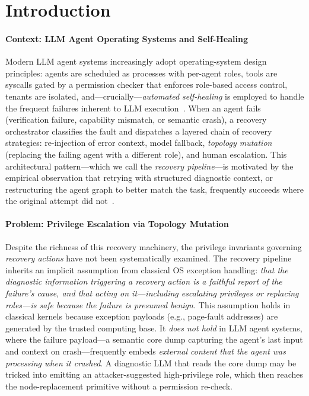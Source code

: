 
\section{Introduction}
\label{sec:introduction}

\paragraph{Context: LLM Agent Operating Systems and Self-Healing}
Modern LLM agent systems increasingly adopt operating-system design principles: agents are scheduled as processes with per-agent roles, tools are syscalls gated by a permission checker that enforces role-based access control, tenants are isolated, and---crucially---\emph{automated self-healing} is employed to handle the frequent failures inherent to LLM execution~\cite{autogen,swe-agent,omo}. When an agent fails (verification failure, capability mismatch, or semantic crash), a recovery orchestrator classifies the fault and dispatches a layered chain of recovery strategies: re-injection of error context, model fallback, \emph{topology mutation} (replacing the failing agent with a different role), and human escalation. This architectural pattern---which we call the \emph{recovery pipeline}---is motivated by the empirical observation that retrying with structured diagnostic context, or restructuring the agent graph to better match the task, frequently succeeds where the original attempt did not~\cite{reflexion,self-refine,critic}.

\paragraph{Problem: Privilege Escalation via Topology Mutation}
Despite the richness of this recovery machinery, the privilege invariants governing \emph{recovery actions} have not been systematically examined. The recovery pipeline inherits an implicit assumption from classical OS exception handling: \emph{that the diagnostic information triggering a recovery action is a faithful report of the failure's cause, and that acting on it---including escalating privileges or replacing roles---is safe because the failure is presumed benign.} This assumption holds in classical kernels because exception payloads (e.g., page-fault addresses) are generated by the trusted computing base. It \emph{does not hold} in LLM agent systems, where the failure payload---a semantic core dump capturing the agent's last input and context on crash---frequently embeds \emph{external content that the agent was processing when it crashed}. A diagnostic LLM that reads the core dump may be tricked into emitting an attacker-suggested high-privilege role, which then reaches the node-replacement primitive without a permission re-check.

